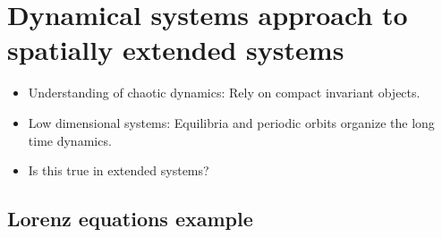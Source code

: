 \documentclass{beamer}
\begin{document}
\section[Dynamicist's view of turbulence]{Dynamical systems approach to spatially extended systems}

\begin{frame}{}
 \begin{itemize}
  \item Understanding of chaotic dynamics: Rely on compact invariant objects.
  \item Low dimensional systems: Equilibria and periodic orbits organize the long time dynamics.
  \item Is this true in extended systems?
 \end{itemize}

\end{frame}





\subsection{Lorenz equations example}
\end{document}
